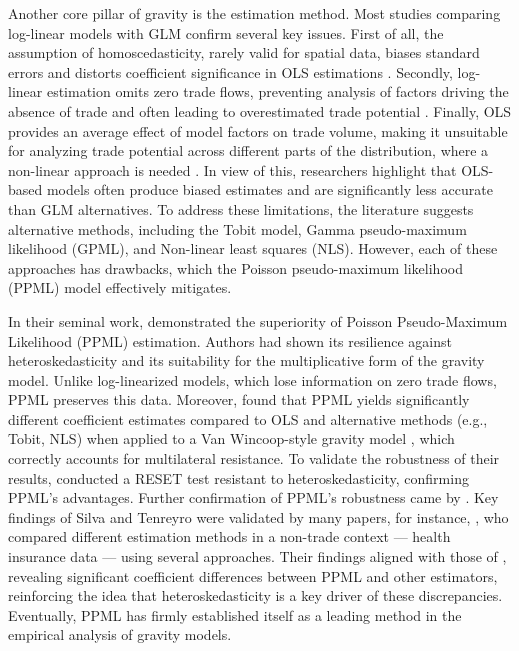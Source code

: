 Another core pillar of gravity is the estimation method. Most studies comparing log-linear models with GLM confirm several key issues. First of all, the assumption of homoscedasticity, rarely valid for spatial data, biases standard errors and distorts coefficient significance in OLS estimations \parencite{egger2015multi}. Secondly, log-linear estimation omits zero trade flows, preventing analysis of factors driving the absence of trade and often leading to overestimated trade potential \parencite{martinez2013log, egger2016glm}. Finally, OLS provides an average effect of model factors on trade volume, making it unsuitable for analyzing trade potential across different parts of the distribution, where a non-linear approach is needed \parencite{silva2006log}. In view of this, researchers highlight that OLS-based models often produce biased estimates and are significantly less accurate than GLM alternatives. To address these limitations, the literature suggests alternative methods, including the Tobit model, Gamma pseudo-maximum likelihood (GPML), and Non-linear least squares (NLS). However, each of these approaches has drawbacks, which the Poisson pseudo-maximum likelihood (PPML) model effectively mitigates.

In their seminal work, \textcite{silva2006log} demonstrated the superiority of Poisson Pseudo-Maximum Likelihood (PPML) estimation. Authors had shown its resilience against heteroskedasticity and its suitability for the multiplicative form of the gravity model. Unlike log-linearized models, which lose information on zero trade flows, PPML preserves this data. Moreover, \textcite{silva2006log} found that PPML yields significantly different coefficient estimates compared to OLS and alternative methods (e.g., Tobit, NLS) when applied to a Van Wincoop-style gravity model \parencite{anderson2003gravity}, which correctly accounts for multilateral resistance. To validate the robustness of their results, \textcite{silva2006log} conducted a RESET test resistant to heteroskedasticity, confirming PPML’s advantages. Further confirmation of PPML’s robustness came by \parencite{silva2011further}. Key findings of Silva and Tenreyro were validated by many papers, for instance, \textcite{motta2019estimating}, who compared different estimation methods in a non-trade context — health insurance data — using several approaches. Their findings aligned with those of \textcite{silva2006log}, revealing significant coefficient differences between PPML and other estimators, reinforcing the idea that heteroskedasticity is a key driver of these discrepancies. Eventually, PPML has firmly established itself as a leading method in the empirical analysis of gravity models.

